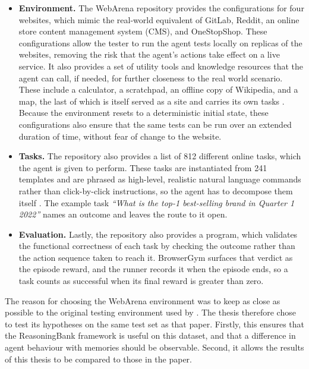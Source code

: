 \begin{itemize}
    \item \textbf{Environment.} The WebArena repository provides the
    configurations for four websites, which mimic the real-world equivalent of
    GitLab, Reddit, an online store content management system (CMS), and
    OneStopShop. These configurations allow the tester to run the agent tests
    locally on replicas of the websites, removing the risk that the agent's
    actions take effect on a live service. It also provides a set of utility
    tools and knowledge resources that the agent can call, if needed, for
    further closeness to the real world scenario. These include a calculator, a
    scratchpad, an offline copy of Wikipedia, and a map, the last of which is
    itself served as a site and carries its own tasks \citep{zhou2024webarena}.
    Because the environment resets to a deterministic initial state, these
    configurations also ensure that the same tests can be run over an extended
    duration of time, without fear of change to the website.

    \item \textbf{Tasks.} The repository also provides a list of 812 different
    online tasks, which the agent is given to perform. These tasks are
    instantiated from 241 templates and are phrased as high-level, realistic
    natural language commands rather than click-by-click instructions, so the
    agent has to decompose them itself \citep{zhou2024webarena}. The example
    task \textit{``What is the top-1 best-selling brand in Quarter 1 2022''}
    names an outcome and leaves the route to it open.

    \item \textbf{Evaluation.} Lastly, the repository also provides a program,
    which validates the functional correctness of each task by checking the
    outcome rather than the action sequence taken to reach it. BrowserGym
    surfaces that verdict as the episode reward, and the runner records it when
    the episode ends, so a task counts as successful when its final reward is
    greater than zero.
\end{itemize}

The reason for choosing the WebArena environment was to keep as close as possible to the original testing environment used by \citet{ouyang2025reasoningbank}. The thesis therefore chose to test its hypotheses on the same test set as that paper. Firstly, this ensures that the ReasoningBank framework is useful on this dataset, and that a difference in agent behaviour with memories should be observable. Second, it allows the results of this thesis to be compared to those in the paper.

